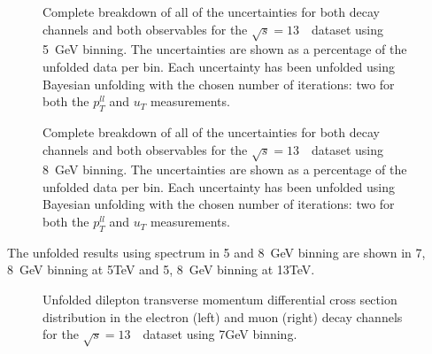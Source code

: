 
\begin{figure}[h]
\centering

\caption{Complete breakdown of all of the uncertainties for both \Zboson decay channels and both observables for the $\sqrt{s} = 13$~\TeV\ dataset using 5~GeV binning. The uncertainties are shown as a percentage of the unfolded data per \pT bin. Each uncertainty has been unfolded using Bayesian unfolding with the chosen number of iterations: two for both the $p_{T}^{ll}$ and $u_{T}$ measurements.}\end{figure}

\begin{figure}[h]
\centering

\caption{Complete breakdown of all of the uncertainties for both \Zboson decay channels and both observables for the $\sqrt{s} = 13$~\TeV\ dataset using 8~GeV binning. The uncertainties are shown as a percentage of the unfolded data per \pT bin. Each uncertainty has been unfolded using Bayesian unfolding with the chosen number of iterations: two for both the $p_{T}^{ll}$ and $u_{T}$ measurements.}\end{figure}


The unfolded results using \ut spectrum in 5 and 8~GeV binning are shown in 7, 8~GeV binning at 5TeV and 5, 8~GeV binning at 13TeV.



\begin{figure}[h]
\centering

\caption{Unfolded dilepton transverse momentum differential cross section distribution in the electron (left) and muon (right) \Zboson decay channels for the $\sqrt{s} = 13$~\TeV\ dataset using 7GeV binning.}\end{figure}


